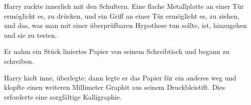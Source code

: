 Harry zuckte innerlich mit den Schultern. Eine flache Metallplatte an einer Tür ermöglicht es, zu drücken, und ein Griff an einer Tür ermöglicht es, zu ziehen, und das, was man mit einer überprüfbaren Hypothese tun sollte, ist, hinzugehen und sie zu testen.

Er nahm ein Stück liniertes Papier von seinem Schreibtisch und begann zu schreiben.

\begin{writtenNote}
\end{writtenNote}

Harry hielt inne, überlegte; dann legte er das Papier für ein anderes weg und klopfte einen weiteren Millimeter Graphit aus seinem Druckbleistift. Dies erforderte eine sorgfältige Kalligraphie.


